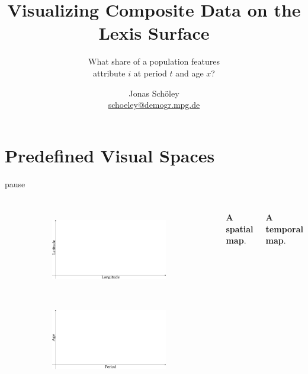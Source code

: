 \documentclass{beamer}
\title{Visualizing Composite Data on the Lexis Surface}
\subtitle{What share of a population features\\attribute $i$ at period $t$ and age $x$?}
\author{Jonas Schöley\\\url{schoeley@demogr.mpg.de}}
\institute{\texttt{[image: ./misc/EDSDLogo.pdf]}}
\begin{document}
{
%
\begin{frame}[plain]
\titlepage
\end{frame}
}

\section{Predefined Visual Spaces} %


\begin{frame}{pause}
\frametitle{\insertsection}

\begin{columns}[c]

\begin{figure}[!htb]
\centering
\begin{subfigure}[c]{\textwidth}
\includegraphics[width = \textwidth]{../fig/plot-spatial_map_empty.pdf}
\end{subfigure}\\
\begin{subfigure}[c]{\textwidth}
\includegraphics[width = \textwidth]{../fig/plot-temporal_map_empty.pdf}
\end{subfigure}
\end{figure}

\footnotesize\textbf{A spatial map}.

\vspace{2.5cm}

\footnotesize\textbf{A temporal map}.

\end{columns}

\end{frame}
\end{document}
